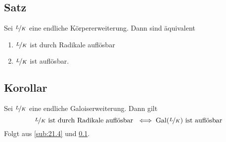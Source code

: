 \subsection[Satz: Durch Radikale auflösbar ist äquivalent zu auflösbar]{Satz} %
\label{sub:215}
Sei $\nicefrac{L}{K}$ eine endliche Körpererweiterung. Dann sind äquivalent
\begin{multicols}{2}
	\begin{enumerate}[(1)]
		\item $\nicefrac{L}{K}$ ist durch Radikale auflösbar 
		\item $\nicefrac{L}{K}$ ist auflösbar.
	\end{enumerate}
\end{multicols}

\subsection[Korollar: Die Galois-Gruppen von durch Radikale auflösbaren KE sind auflösbar]{Korollar} %
\label{sub:216}
Sei $\nicefrac{L}{K}$ eine endliche Galoiserweiterung. Dann gilt
\[
	\nicefrac{L}{K} \text{ ist durch Radikale auflösbar } \iff \operatorname{Gal}(\nicefrac{L}{K}) \text{ ist auflösbar}
\] 
Folgt aus \ref{sub:21.4} und \ref{sub:215}. \bewende

